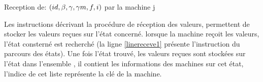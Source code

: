 \begin{procedure}
\setcounter{AlgoLine}{0}	
\SetAlgoLined
\LinesNumbered
  \caption{Reception de: $(id,\beta{},\gamma{},\gamma m{},f,i)$ par la machine j}
\end{procedure}

Les instructions décrivant la procédure de réception des valeurs, permettent de stocker les valeurs reçues sur l'état concerné. lorsque la machine reçoit les valeurs, l'état consterné est recherché (la ligne \ref{linereceve1} présente l'instruction du parcours des états). Une fois l'état trouvé, les valeurs reçues sont stockées sur l'état dans l'ensemble , il contient les informations des machines sur cet état, l'indice de cet liste représente la clé de la machine. 

